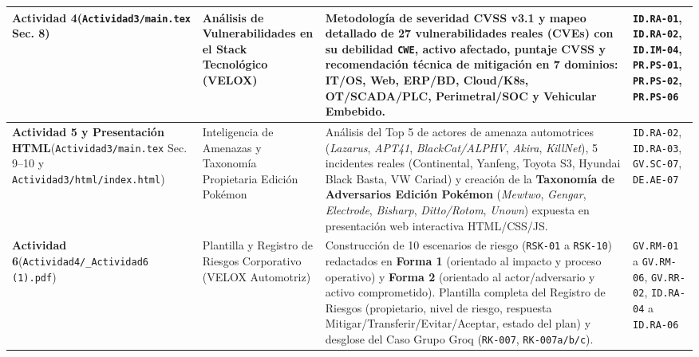 \documentclass[letterpaper,11pt]{article}
\begin{document}
\begin{longtable}{|L{2.8cm}|L{3.5cm}|L{6.2cm}|C{3.8cm}|}
\textbf{Actividad 4}\newline (\texttt{Actividad3/main.tex} Sec. 8) &
Análisis de Vulnerabilidades en el Stack Tecnológico (VELOX) &
Metodología de severidad CVSS v3.1 \autocite{first-cvss} y mapeo detallado de \textbf{27 vulnerabilidades reales (CVEs)} con su debilidad \texttt{CWE}, activo afectado, puntaje CVSS y recomendación técnica de mitigación en 7 dominios: IT/OS, Web, ERP/BD, Cloud/K8s, OT/SCADA/PLC, Perimetral/SOC y Vehicular Embebido. &
\texttt{ID.RA-01}, \texttt{ID.RA-02}, \texttt{ID.IM-04}, \texttt{PR.PS-01}, \texttt{PR.PS-02}, \texttt{PR.PS-06} \\
\hline

\textbf{Actividad 5 y Presentación HTML}\newline (\texttt{Actividad3/main.tex} Sec. 9--10 y \texttt{Actividad3/html/index.html}) &
Inteligencia de Amenazas y Taxonomía Propietaria Edición Pokémon &
Análisis del Top 5 de actores de amenaza automotrices (\textit{Lazarus}, \textit{APT41}, \textit{BlackCat/ALPHV}, \textit{Akira}, \textit{KillNet}), 5 incidentes reales (Continental, Yanfeng, Toyota S3, Hyundai Black Basta, VW Cariad) y creación de la \textbf{Taxonomía de Adversarios Edición Pokémon} (\textit{Mewtwo}, \textit{Gengar}, \textit{Electrode}, \textit{Bisharp}, \textit{Ditto/Rotom}, \textit{Unown}) expuesta en presentación web interactiva HTML/CSS/JS. &
\texttt{ID.RA-02}, \texttt{ID.RA-03}, \texttt{GV.SC-07}, \texttt{DE.AE-07} \\
\hline

\textbf{Actividad 6}\newline (\texttt{Actividad4/\_Actividad6 (1).pdf}) &
Plantilla y Registro de Riesgos Corporativo (VELOX Automotriz) &
Construcción de 10 escenarios de riesgo (\texttt{RSK-01} a \texttt{RSK-10}) redactados en \textbf{Forma 1} (orientado al impacto y proceso operativo) y \textbf{Forma 2} (orientado al actor/adversario y activo comprometido). Plantilla completa del Registro de Riesgos (propietario, nivel de riesgo, respuesta Mitigar/Transferir/Evitar/Aceptar, estado del plan) y desglose del Caso Grupo Groq (\texttt{RK-007}, \texttt{RK-007a/b/c}). &
\texttt{GV.RM-01} a \texttt{GV.RM-06}, \texttt{GV.RR-02}, \texttt{ID.RA-04} a \texttt{ID.RA-06} \\
\hline


\end{longtable}
\end{document}
